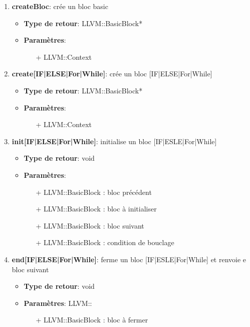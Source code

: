 \documentclass{article}
\begin{document}
  \begin{enumerate}
  \item \textbf{createBloc}: crée un bloc basic
  \begin{itemize}
    \item \textbf{Type de retour}: LLVM::BasicBlock*
    \item \textbf{Paramètres}:
    \begin{enumerate}
      \item[+] LLVM::Context
    \end{enumerate}
  \end{itemize}

  \item \textbf{create[IF|ELSE|For|While]}: crée un bloc [IF|ELSE|For|While]
  \begin{itemize}
    \item \textbf{Type de retour}: LLVM::BasicBlock*
    \item \textbf{Paramètres}:
    \begin{enumerate}
      \item[+] LLVM::Context
    \end{enumerate}
  \end{itemize} 

  \item \textbf{init[IF|ELSE|For|While]}: initialise un bloc [IF|ESLE|For|While]
  \begin{itemize}
    \item \textbf{Type de retour}: void
    \item \textbf{Paramètres}:
    \begin{enumerate}
      \item[+] LLVM::BasicBlock : bloc précédent
      \item[+] LLVM::BasicBlock : bloc à initialiser
      \item[+] LLVM::BasicBlock : bloc suivant
      \item[+] LLVM::BasicBlock : condition de bouclage      
    \end{enumerate}
  \end{itemize} 

  \item \textbf{end[IF|ELSE|For|While]}: ferme un bloc [IF|ESLE|For|While] et renvoie e bloc suivant
  \begin{itemize}
    \item \textbf{Type de retour}: void
    \item \textbf{Paramètres}: LLVM::
    \begin{enumerate}
      \item[+] LLVM::BasicBlock : bloc à fermer
    \end{enumerate}
  \end{itemize} 


  \end{enumerate}
\end{document}

